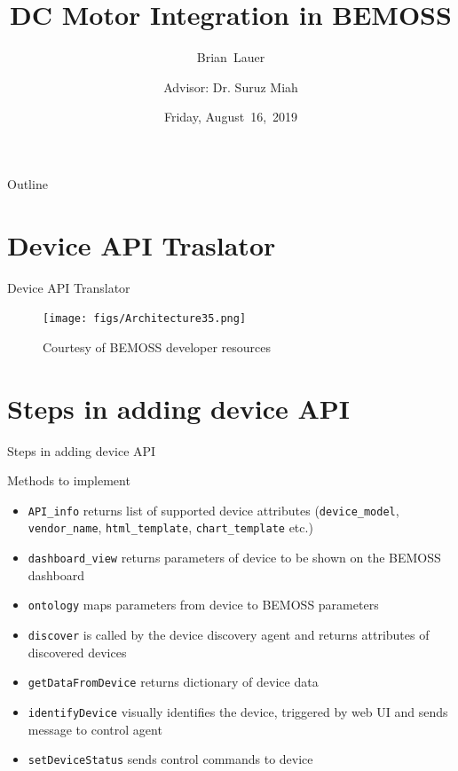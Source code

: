 \documentclass{beamer}
\title[DC Motor Integration]{DC Motor Integration in BEMOSS}
\author[B.~Lauer]{Brian~Lauer\\\and
Advisor: Dr. Suruz Miah}
\institute[Bradley University] %
{
  Department of Electrical and Computer Engineering\\
  Bradley University\\
  1501 W. Bradley Avenue\\
  Peoria, IL, 61625, USA
}
\date[August~16,~2019]{Friday, August~16,~2019}
\begin{document}
\begin{frame}
  \titlepage
\end{frame}

\begin{frame}{Outline}
  \tableofcontents
\end{frame}

\section{Device API Traslator}


\begin{frame}{Device API Translator}{}
\begin{figure}
\texttt{[image: figs/Architecture35.png]}
\caption{Courtesy of BEMOSS developer resources}
\end{figure}
\end{frame}

\section{Steps in adding device API}

\begin{frame}{Steps in adding device API}{}
\begin{block}{Methods to implement}
\begin{itemize}
	\item \texttt{API\_info} returns list of supported device attributes (\texttt{device\_model}, \texttt{vendor\_name}, \texttt{html\_template}, \texttt{chart\_template} etc.)
	\item \texttt{dashboard\_view} returns parameters of device to be shown on the BEMOSS dashboard
	\item \texttt{ontology} maps parameters from device to BEMOSS parameters
	\item \texttt{discover} is called by the device discovery agent and returns attributes of discovered devices
	\item \texttt{getDataFromDevice} returns dictionary of device data
	\item \texttt{identifyDevice} visually identifies the device, triggered by web UI and sends message to control agent
	\item \texttt{setDeviceStatus} sends control commands to device
\end{itemize}
\end{block}
\end{frame}
\end{document}

